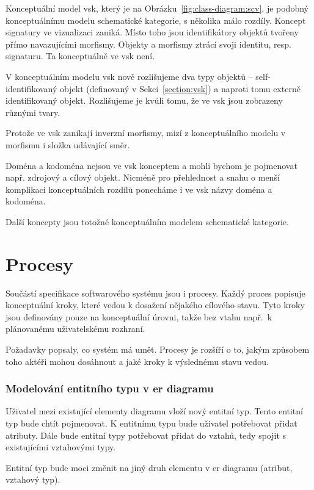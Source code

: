Konceptuální model \acrfull{vsk}, který je na Obrázku~\ref{fig:class-diagram:scv}, je podobný konceptuálnímu modelu schematické kategorie, s několika málo rozdíly.
Koncept signatury ve vizualizaci zaniká.
Místo toho jsou identifikátory objektů tvořeny přímo navazujícími morfismy.
Objekty a morfismy ztrácí svoji identitu, resp. signaturu.
Ta konceptuálně ve \acrshort{vsk} není.

V konceptuálním modelu \acrshort{vsk} nově rozlišujeme dva typy objektů -- self-identifikovaný objekt (definovaný v Sekci~\ref{section:vsk}) a naproti tomu externě identifikovaný objekt.
Rozlišujeme je kvůli tomu, že ve \acrshort{vsk} jsou zobrazeny různými tvary.

Protože ve \acrshort{vsk} zanikají inverzní morfismy, mizí z konceptuálního modelu v morfismu i složka udávající směr.

Doména a kodoména nejsou ve \acrshort{vsk} konceptem a mohli bychom je pojmenovat např. zdrojový a cílový objekt.
Nicméně pro přehlednost a snahu o menší komplikaci konceptuálních rozdílů ponecháme i ve \acrshort{vsk} názvy doména a kodoména.

Další koncepty jsou totožné konceptuálním modelem schematické kategorie.

\section{Procesy}

Součástí specifikace softwarového systému jsou i procesy.
Každý proces popisuje konceptuální kroky, které vedou k dosažení nějakého cílového stavu.
Tyto kroky jsou definovány pouze na konceptuální úrovni, takže bez vtahu např.~k plánovanému uživatelskému rozhraní.

Požadavky popsaly, co systém má umět.
Procesy je rozšíří o to, jakým způsobem toho aktéři mohou dosáhnout a jaké kroky k výslednému stavu vedou.

\subsubsection*{Modelování entitního typu v \acrshort{er} diagramu}

Uživatel mezi existující elementy diagramu vloží nový entitní typ.
Tento entitní typ bude chtít pojmenovat.
K entitnímu typu bude uživatel potřebovat přidat atributy.
Dále bude entitní typy potřebovat přidat do vztahů, tedy spojit s existujícími vztahovými typy.

Entitní typ bude moci změnit na jiný druh elementu v \acrshort{er} diagramu (atribut, vztahový typ).

